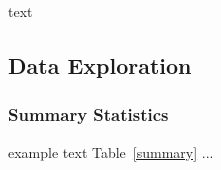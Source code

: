 \documentclass[11pt, a4paper]{article}
\begin{document}
text







\subsection{Data Exploration}

\subsubsection{Summary Statistics}








example text Table~\ref{summary} ...


\end{document}
